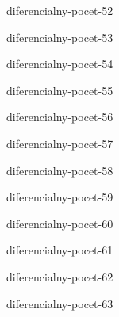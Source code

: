\begin{defproblem}{diferencialny-pocet-52}

\end{defproblem}

\begin{defproblem}{diferencialny-pocet-53}

\end{defproblem}

\begin{defproblem}{diferencialny-pocet-54}

\end{defproblem}

\begin{defproblem}{diferencialny-pocet-55}

\end{defproblem}

\begin{defproblem}{diferencialny-pocet-56}

\end{defproblem}

\begin{defproblem}{diferencialny-pocet-57}

\end{defproblem}

\begin{defproblem}{diferencialny-pocet-58}

\end{defproblem}

\begin{defproblem}{diferencialny-pocet-59}

\end{defproblem}

\begin{defproblem}{diferencialny-pocet-60}

\end{defproblem}

\begin{defproblem}{diferencialny-pocet-61}

\end{defproblem}

\begin{defproblem}{diferencialny-pocet-62}

\end{defproblem}

\begin{defproblem}{diferencialny-pocet-63}

\end{defproblem}

